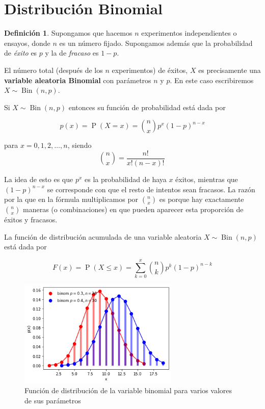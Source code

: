 \documentclass[]{book}
\theoremstyle{plain}
\theoremstyle{definition}
\newtheorem{definition}[theorem]{Definición}
\theoremstyle{definition} %
\begin{document}
\section{Distribución Binomial} 

\begin{definition}
  
Supongamos que hacemos \(n\) experimentos independientes o ensayos,
donde \(n\) es un número fijado. Supongamos además que la probabilidad
de \emph{éxito} es \(p\) y la de \emph{fracaso} es \(1-p\).

El número total (después de los \(n\) experimentos) de éxitos, \(X\) es
precisamente una \textbf{variable aleatoria Binomial} con parámetros
\(n\) y \(p\). En este caso escribiremos
\(\displaystyle X\sim \operatorname {Bin} (n,p)\).

Si \(\displaystyle X\sim \operatorname {Bin} (n,p)\) entonces su función
de probabilidad está dada por

\[p(x)=\displaystyle \operatorname {P} (X=x)={n \choose x}p^{x}(1-p)^{n-x}\]

para \(\displaystyle x=0,1,2,\dots ,n\), siendo
\[\displaystyle \!{n \choose x}={\frac {n!}{x!(n-x)!}}\,\!\]

La idea de esto es que \(p^x\) es la probabilidad de haya \(x\) éxitos,
mientras que \((1-p)^{n-x}\) se corresponde con que el resto de intentos
sean fracasos. La razón por la que en la fórmula multiplicamos por
\(n \choose x\) es porque hay exactamente \(n \choose x\) maneras (o
combinaciones) en que pueden aparecer esta proporción de éxitos y
fracasos.

La función de distribución acumulada de una variable aleatoria
\(\displaystyle X\sim \operatorname {Bin} (n,p)\) está dada por

\[\displaystyle F(x)=\operatorname {P} (X\leq x)=\sum _{k=0}^{x}{n \choose k}p^{k}(1-p)^{n-k}\]
\end{definition}

\begin{figure}
  \centering
  \includegraphics[width=3in,height=\textheight]{img/binom.png}
  \caption{Función de distribución de la variable binomial para varios valores de sus parámetros}
\end{figure}
\end{document}
